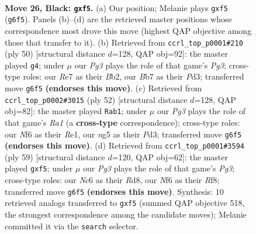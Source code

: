 \documentclass[11pt]{article}
\begin{document}
\clearpage

\begin{figure}[p]\centering
\begin{subfigure}{0.46\textwidth}\centering
\resizebox{\linewidth}{!}{%
\newchessgame
\chessboard[
  setfen={r5k1/Pb2rp2/1pn2np1/qN1p1PNp/P2P3P/R2B2P1/2Q2K2/7R b - - 0 26},
  showmover=false,
  pgfstyle=straightmove, color=movearrow, markmove={g6-f5}
]}
\caption{}
\end{subfigure}\hfill
\begin{subfigure}{0.46\textwidth}\centering
\resizebox{\linewidth}{!}{%
\newchessgame
\chessboard[
  setfen={3r2k1/2q1bpp1/r3pn2/2p1Rn1p/NpN2P2/1P1P1QPP/1BP5/5RK1 w - - 0 26},
  showmover=false,
  pgfstyle=straightmove, color=movearrow, markmove={g3-g4}
]}
\caption{}
\end{subfigure}
\\[4pt]
\begin{subfigure}{0.46\textwidth}\centering
\resizebox{\linewidth}{!}{%
\newchessgame
\chessboard[
  setfen={r3rbk1/1q3pp1/3pn2p/1p2pQ1P/1P2P3/3PBNP1/5P2/R3R1K1 w - - 1 27},
  showmover=false,
  pgfstyle=straightmove, color=movearrow, markmove={a1-b1}
]}
\caption{}
\end{subfigure}\hfill
\begin{subfigure}{0.46\textwidth}\centering
\resizebox{\linewidth}{!}{%
\newchessgame
\chessboard[
  setfen={3r1rk1/q6p/bN1p2pP/P1p1pP2/1nP2n2/1N2Q3/1R3PP1/R4BK1 b - - 2 30},
  showmover=false,
  pgfstyle=straightmove, color=movearrow, markmove={g6-f5}
]}
\caption{}
\end{subfigure}
\caption{\textbf{Move 26, Black: \texttt{gxf5}.} (a) Our position; Melanie plays \texttt{gxf5} (\texttt{g6f5}). Panels (b)--(d) are the retrieved master positions whose correspondence most drove this move (highest QAP objective among those that transfer to it). (b) Retrieved from \texttt{ccrl\_top\_p0001\#210} (ply 50) [structural distance $d$=128, QAP obj=92]: the master played \texttt{g4}; under $\mu$ our \emph{Pg3} plays the role of that game's \emph{Pg3}; cross-type roles: our \emph{R}e7 as their \emph{B}b2, our \emph{B}b7 as their \emph{P}d3; transferred move \texttt{g6f5} \textbf{(endorses this move)}. (c) Retrieved from \texttt{ccrl\_top\_p0002\#3015} (ply 52) [structural distance $d$=128, QAP obj=82]: the master played \texttt{Rab1}; under $\mu$ our \emph{Pg3} plays the role of that game's \emph{Ra1} (a \textbf{cross-type} correspondence); cross-type roles: our \emph{N}f6 as their \emph{R}e1, our \emph{n}g5 as their \emph{P}d3; transferred move \texttt{g6f5} \textbf{(endorses this move)}. (d) Retrieved from \texttt{ccrl\_top\_p0001\#3594} (ply 59) [structural distance $d$=120, QAP obj=62]: the master played \texttt{gxf5}; under $\mu$ our \emph{Pg3} plays the role of that game's \emph{Pg3}; cross-type roles: our \emph{N}c6 as their \emph{R}d8, our \emph{N}f6 as their \emph{R}f8; transferred move \texttt{g6f5} \textbf{(endorses this move)}. Synthesis: 10 retrieved analogs transferred to \texttt{gxf5} (summed QAP objective 518, the strongest correspondence among the candidate moves); Melanie committed it via the \texttt{search} selector.}
\label{fig:thought-m51}
\end{figure}
\end{document}
